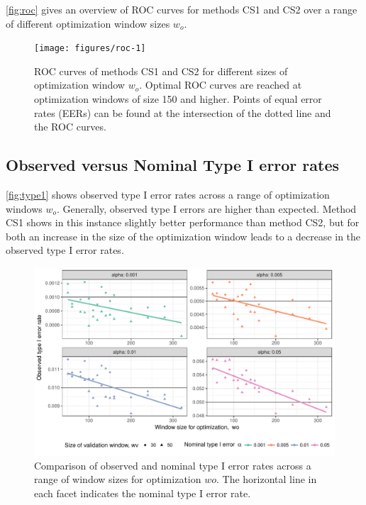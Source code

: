 \documentclass[12pt]{article}
\begin{document}
\autoref{fig:roc} gives an overview of ROC curves for methods CS1 and
CS2 over a range of different optimization window sizes \(w_o\).

\begin{figure}

{\centering \texttt{[image: figures/roc-1]} 

}

\caption{ROC curves of methods CS1 and CS2 for different sizes of optimization window $w_o$. Optimal ROC curves are reached at optimization windows of size 150 and higher. Points of equal error rates (EERs) can be found at the intersection of the dotted line and the ROC curves.}\label{fig:roc}
\end{figure}

\subsection{Observed versus Nominal Type I error
rates}\label{observed-versus-nominal-type-i-error-rates}

\autoref{fig:type1} shows observed type I error rates across a range of
optimization windows \(w_o\). Generally, observed type I errors are
higher than expected. Method CS1 shows in this instance slightly better
performance than method CS2, but for both an increase in the size of the
optimization window leads to a decrease in the observed type I error
rates.

\begin{figure}

{\centering \includegraphics[width=\textwidth]{figures/type1-1} 

}

\caption{Comparison of observed and nominal type I error rates  across a range of window sizes for optimization $wo$. The horizontal line in each facet indicates the nominal type I error rate.}\label{fig:type1}
\end{figure}
\end{document}
